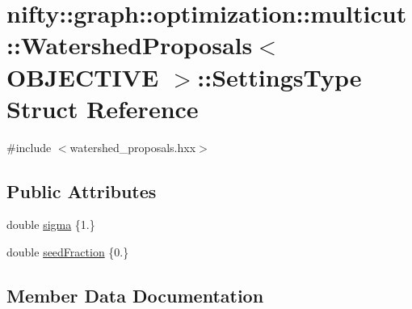 \hypertarget{structnifty_1_1graph_1_1optimization_1_1multicut_1_1WatershedProposals_1_1SettingsType}{}\section{nifty\+:\+:graph\+:\+:optimization\+:\+:multicut\+:\+:Watershed\+Proposals$<$ O\+B\+J\+E\+C\+T\+I\+V\+E $>$\+:\+:Settings\+Type Struct Reference}
\label{structnifty_1_1graph_1_1optimization_1_1multicut_1_1WatershedProposals_1_1SettingsType}


{\ttfamily \#include $<$watershed\+\_\+proposals.\+hxx$>$}

\subsection*{Public Attributes}
\begin{DoxyCompactItemize}
\item 
double \hyperlink{structnifty_1_1graph_1_1optimization_1_1multicut_1_1WatershedProposals_1_1SettingsType_a015986f91cf741f2992ca66219d1d0d8}{sigma} \{1.\}
\item 
double \hyperlink{structnifty_1_1graph_1_1optimization_1_1multicut_1_1WatershedProposals_1_1SettingsType_a9632f51291234a1a5ae90e01ade142a4}{seed\+Fraction} \{0.\}
\end{DoxyCompactItemize}


\subsection{Member Data Documentation}
\hypertarget{structnifty_1_1graph_1_1optimization_1_1multicut_1_1WatershedProposals_1_1SettingsType_a9632f51291234a1a5ae90e01ade142a4}{}
